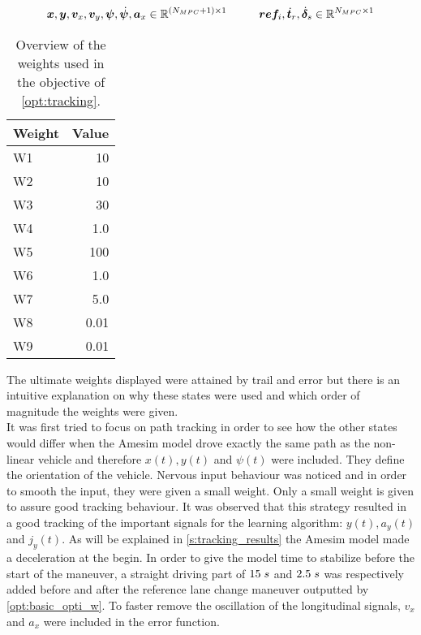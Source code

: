 \[\bm{x},\bm{y},\bm{v}_x,\bm{v}_y,\bm{\psi},\dot{\bm{\psi}},\bm{a}_x \in \mathbb{R}^{(N_{MPC}+1)\times1} \hspace{10mm}\bm{ref}_{i},\dot{\bm{t}}_r,\dot{\bm{\delta}}_s \in \mathbb{R}^{N_{MPC}\times1}\]


\begin{table}[h!]
	\centering
	\begin{tabular}{@{}lr@{}} 
		Weight    & Value\\ \midrule
		W1      & 10\\
		W2          & 10\\
		W3 	   & 30\\
		W4       & 1.0\\
		W5       & 100\\
		W6       & 1.0\\
		W7       & 5.0\\
		W8       & 0.01\\
		W9  & 0.01\\ \bottomrule
	\end{tabular}
	\caption{Overview of the weights used in the objective of \ref{opt:tracking}.}
	\label{tab:weights}
\end{table}

The ultimate weights displayed were attained by trail and error but there is an intuitive explanation on why these states were used and which order of magnitude the weights were given.\\
It was first tried to focus on path tracking in order to see how the other states would differ when the Amesim model drove exactly the same path as the non-linear vehicle and therefore $x(t),y(t)$ and $\psi(t)$ were included. They define the orientation of the vehicle. Nervous input behaviour was noticed and in order to smooth the input, they were given a small weight. Only a small weight is given to assure  good tracking behaviour. It was observed that this strategy resulted in a good tracking of the important signals for the learning algorithm: $y(t), a_y(t)$ and $j_y(t)$. As will be explained in \ref{s:tracking_results} the Amesim model made a deceleration at the begin. In order to  give the model time to stabilize before the start of the maneuver, a straight driving part of $15\hspace{1mm}s$ and $2.5\hspace{1mm}s$ was respectively added before and after the reference lane change maneuver outputted by \ref{opt:basic_opti_w}. To faster remove the oscillation of the longitudinal signals, $v_x$ and $a_x$ were included in the error function.\\

